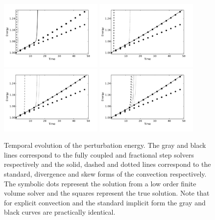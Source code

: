 \begin{figure}
\includegraphics[width=0.45\textwidth]{chapters/mortensen/pdf/OS_energy_cfl_0_1_model_1.pdf}
\includegraphics[width=0.45\textwidth]{chapters/mortensen/pdf/OS_energy_cfl_0_1_model_0.pdf}
\includegraphics[width=0.45\textwidth]{chapters/mortensen/pdf/OS_energy_cfl_0_05_model_1.pdf}
\includegraphics[width=0.45\textwidth]{chapters/mortensen/pdf/OS_energy_cfl_0_05_model_0.pdf}
 \caption{ Temporal evolution of the perturbation energy. The gray and black lines correspond to the fully coupled and fractional step solvers respectively and the solid, dashed and dotted lines correspond to the standard, divergence and skew forms of the convection respectively. The symbolic dots represent the solution from a low order finite volume solver and the squares represent the true solution. Note that for explicit convection and the standard implicit form the gray and black curves are practically identical. }
\label{fig:mortensen:OS_long_time}
\end{figure}

